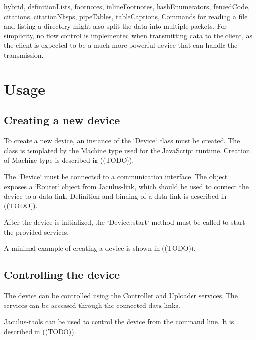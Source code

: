 \begin{markdown*}{%
  hybrid,
  definitionLists,
  footnotes,
  inlineFootnotes,
  hashEnumerators,
  fencedCode,
  citations,
  citationNbsps,
  pipeTables,
  tableCaptions,
}
Commands for reading a file and listing a directory might also split the data into multiple packets. For simplicity, no flow control is implemented when transmitting data to the client, as the client is expected to be a much more powerful device that can handle the transmission.


\section{Usage}

\subsection{Creating a new device}

To create a new device, an instance of the `Device` class must be created. The class is templated by the Machine type used for the JavaScript runtime. Creation of Machine type is described in ((TODO)).

The `Device` must be connected to a communication interface. The object exposes a `Router` object from Jaculus-link, which should be used to connect the device to a data link. Definition and binding of a data link is described in ((TODO)).

After the device is initialized, the `Device::start` method must be called to start the provided services.

A minimal example of creating a device is shown in ((TODO)).

\subsection{Controlling the device}

The device can be controlled using the Controller and Uploader services. The services can be accessed through the connected data links.

Jaculus-tools can be used to control the device from the command line. It is described in ((TODO)).


\end{markdown*}
